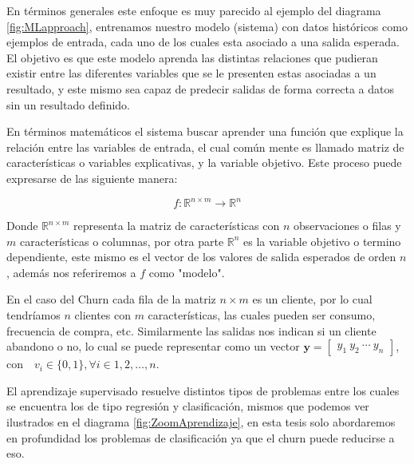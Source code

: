 En términos generales este enfoque es muy parecido al ejemplo del diagrama \ref{fig:MLapproach}, entrenamos nuestro modelo (sistema) con datos históricos como ejemplos de entrada, cada uno de los cuales esta asociado a una salida esperada. El objetivo es que este modelo aprenda las distintas relaciones que pudieran existir entre las diferentes variables que se le presenten estas asociadas a un resultado, y este mismo sea capaz de predecir salidas de forma correcta a datos sin un resultado definido.

En términos matemáticos el sistema buscar aprender una función que explique la relación entre las variables de entrada, el cual común mente es llamado matriz de características o variables explicativas, y la variable objetivo. Este proceso puede expresarse de las siguiente manera:

\begin{micaja2}
	\begin{equation}
		f: \mathbb{R}^{n\times m} \rightarrow \mathbb{R}^n
	\end{equation}
	\label{EC:MapaML}
\end{micaja2}

Donde $ \mathbb{R}^{n\times m} $ representa la matriz de características con $n$ observaciones o filas y $m$ características o columnas, por otra parte $\mathbb{R}^n$ es la variable objetivo o termino dependiente, este mismo es el vector de los valores de salida esperados de orden $n$, además nos referiremos a $f$ como "modelo".

En el caso del Churn cada fila de la matriz $n \times m$ es un cliente, por lo cual tendríamos $n$ clientes con $m$ características, las cuales pueden ser consumo, frecuencia de compra, etc. Similarmente las salidas nos indican si un cliente abandono o no, lo cual se puede representar como un vector $ \mathbf{y} = \begin{bmatrix} y_1 \ y_2 \ \cdots \ y_n \end{bmatrix}$, con$\quad v_i \in \{0, 1\}, \forall i \in {1, 2, \dots, n} $.

El aprendizaje supervisado resuelve distintos tipos de problemas entre los cuales se encuentra los de tipo regresión y clasificación, mismos que podemos ver ilustrados en el diagrama \ref{fig:ZoomAprendizaje}, en esta tesis solo abordaremos en profundidad los problemas de clasificación ya que el churn puede reducirse a eso. 


